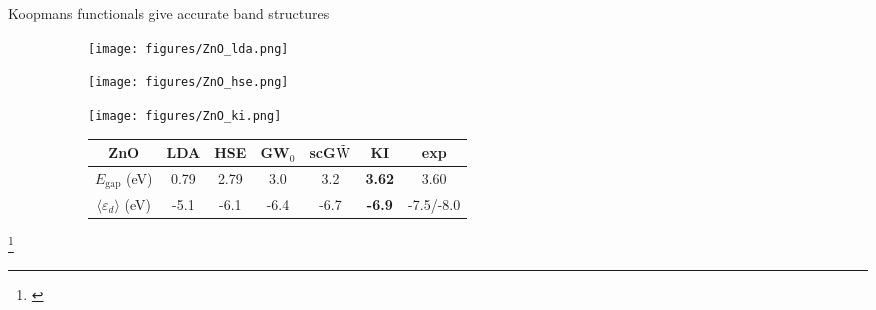 \documentclass[xcolor=table,aspectratio=169]{beamer}
\newcommand\blfootcite[1]{%
  \begingroup
  \renewcommand\thefootnote{}\footnote{\hspace{-4ex}\cite{#1}}%
  \addtocounter{footnote}{-1}%
  \endgroup
}
\numberwithin{equation}{section}
\begin{document}
\begin{frame}{\normalsize Koopmans functionals give accurate band structures}
   \begin{figure}[t]
      \centering
      \begin{subfigure}{0.3\textwidth}
         \texttt{[image: figures/ZnO\_lda.png]}
      \end{subfigure}
      \begin{subfigure}{0.3\textwidth}
         \texttt{[image: figures/ZnO\_hse.png]}
      \end{subfigure}
      \begin{subfigure}{0.3\textwidth}
         \texttt{[image: figures/ZnO\_ki.png]}
      \end{subfigure}
      \begin{subfigure}{\textwidth} %
         \centering
         \begin{tabular}{c S[table-format = 2.2] S[table-format = 2.2] S[table-format = 2.2] S[table-format = 2.2] >{\color{seaborn_red}\bfseries}S[table-format = 2.2] S[table-format = 2.2]}
            ZnO                                  & {LDA} & {HSE} & {GW$_0$} & {scG$\tilde{\rm W}$} & {KI} & {exp}       \\
            \hline
            $E_\mathrm{gap}$ (eV)                & 0.79  & 2.79  & 3.0      & 3.2                  & 3.62 & 3.60        \\
            $\langle \varepsilon_d \rangle$ (eV) & -5.1  & -6.1  & -6.4     & -6.7                 & -6.9 & {-7.5/-8.0} \\
         \end{tabular}
      \end{subfigure}
   \end{figure}
   \blfootcite{Colonna2022}
\end{frame}
\end{document}
